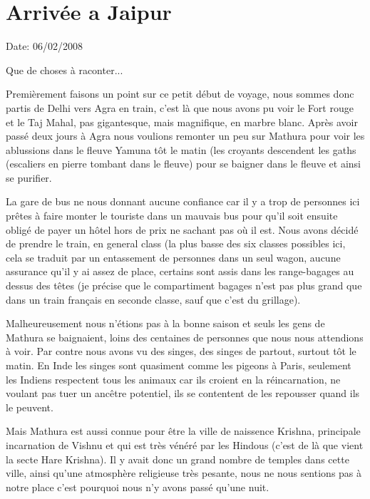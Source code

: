 \section{Arrivée a Jaipur}

Date: 06/02/2008

\begin{multicols}{2}

Que de choses à raconter...

Premièrement faisons un point sur ce petit début de voyage, nous sommes donc partis de Delhi vers Agra en train, c'est là que nous avons pu voir le Fort rouge et le Taj Mahal, pas gigantesque, mais magnifique, en marbre blanc. Après avoir passé deux jours à Agra nous voulions remonter un peu sur Mathura pour voir les ablussions dans le fleuve Yamuna tôt le matin (les croyants descendent les gaths (escaliers en pierre tombant dans le fleuve) pour se baigner dans le fleuve et ainsi se purifier.

La gare de bus ne nous donnant aucune confiance car il y a trop de personnes ici prêtes à faire monter le touriste dans un mauvais bus pour qu'il soit ensuite obligé de payer un hôtel hors de prix ne sachant pas où il est. Nous avons décidé de prendre le train, en general class (la plus basse des six classes possibles ici, cela se traduit par un entassement de personnes dans un seul wagon, aucune assurance qu'il y ai assez de place, certains sont assis dans les range-bagages au dessus des têtes (je précise que le compartiment bagages n'est pas plus grand que dans un train français en seconde classe, sauf que c'est du grillage).

Malheureusement nous n'étions pas à la bonne saison et seuls les gens de Mathura se baignaient, loins des centaines de personnes que nous nous attendions à voir. Par contre nous avons vu des singes, des singes de partout, surtout tôt le matin. En Inde les singes sont quasiment comme les pigeons à Paris, seulement les Indiens respectent tous les animaux car ils croient en la réincarnation, ne voulant pas tuer un ancêtre potentiel, ils se contentent de les repousser quand ils le peuvent.

Mais Mathura est aussi connue pour être la ville de naissence Krishna, principale incarnation de Vishnu et qui est très vénéré par les Hindous (c'est de là que vient la secte Hare Krishna). Il y avait donc un grand nombre de temples dans cette ville, ainsi qu'une atmosphère religieuse très pesante, nous ne nous sentions pas à notre place c'est pourquoi nous n'y avons passé qu'une nuit.


\end{multicols}
